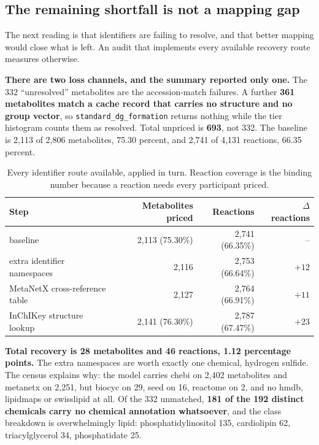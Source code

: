 \subsection{The remaining shortfall is not a mapping gap}

The next reading is that identifiers are failing to resolve, and that better mapping would
close what is left. An audit that implements every available recovery route measures
otherwise.

\textbf{There are two loss channels, and the summary reported only one.} The 332
``unresolved'' metabolites are the accession-match failures. A further \textbf{361
metabolites match a cache record that carries no structure and no group vector}, so
\texttt{standard\_dg\_formation} returns nothing while the tier histogram counts them as
resolved. Total unpriced is \textbf{693}, not 332. The baseline is 2{,}113 of 2{,}806
metabolites, 75.30 percent, and 2{,}741 of 4{,}131 reactions, 66.35 percent.

\begin{table}[H]
  \centering
  \footnotesize
  \caption[Measured recovery]{Every identifier route available, applied in turn. Reaction
  coverage is the binding number because a reaction needs every participant priced.}
  \label{tab:recovery}
  \begin{tabular}{@{}lrrr@{}}
    \hline
    Step & Metabolites priced & Reactions & $\Delta$ reactions \\
    \hline
    baseline & 2{,}113 (75.30\%) & 2{,}741 (66.35\%) & -- \\
    extra identifier namespaces & 2{,}116 & 2{,}753 (66.64\%) & $+12$ \\
    MetaNetX cross-reference table & 2{,}127 & 2{,}764 (66.91\%) & $+11$ \\
    InChIKey structure lookup & 2{,}141 (76.30\%) & 2{,}787 (67.47\%) & $+23$ \\
    \hline
  \end{tabular}
\end{table}

\textbf{Total recovery is 28 metabolites and 46 reactions, 1.12 percentage points.} The
extra namespaces are worth exactly one chemical, hydrogen sulfide. The census explains why:
the model carries chebi on 2{,}402 metabolites and metanetx on 2{,}251, but biocyc on 29,
seed on 16, reactome on 2, and no hmdb, lipidmaps or swisslipid at all. Of the 332
unmatched, \textbf{181 of the 192 distinct chemicals carry no chemical annotation
whatsoever}, and the class breakdown is overwhelmingly lipid: phosphatidylinositol 135,
cardiolipin 62, triacylglycerol 34, phosphatidate 25.


